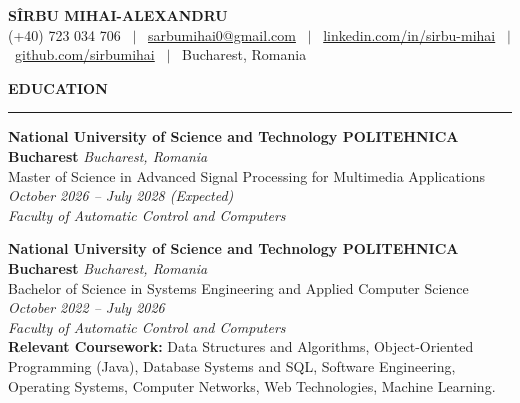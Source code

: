 \documentclass[10pt,letterpaper]{article}
\newenvironment{rSection}[1]{
  \vspace{4pt}
  {\bfseries\MakeUppercase{#1}}
  \vspace{2pt}
  \hrule
  \vspace{3pt}
}{
  \par\vspace{2pt}
}
\begin{document}
\vspace*{-0.4cm}
\begin{center}
    {\Huge \bfseries SÎRBU MIHAI-ALEXANDRU} \\ \vspace{2pt}
    \small (+40) 723 034 706 \ $|$ \ 
    \href{mailto:sarbumihai0@gmail.com}{sarbumihai0@gmail.com} \ $|$ \ 
    \href{https://www.linkedin.com/in/sirbu-mihai-86133b181/}{linkedin.com/in/sirbu-mihai} \ $|$ \ 
    \href{https://github.com/sirbumihai}{github.com/sirbumihai} \ $|$ \ 
    Bucharest, Romania
\end{center}

\vspace{-0.2cm}
\begin{rSection}{Education}
    \textbf{National University of Science and Technology POLITEHNICA Bucharest} \hfill \textit{Bucharest, Romania} \\
    Master of Science in Advanced Signal Processing for Multimedia Applications \hfill \textit{October 2026 – July 2028 (Expected)} \\
    \textit{Faculty of Automatic Control and Computers}

    \vspace{3pt}
    \textbf{National University of Science and Technology POLITEHNICA Bucharest} \hfill \textit{Bucharest, Romania} \\
    Bachelor of Science in Systems Engineering and Applied Computer Science \hfill \textit{October 2022 – July 2026} \\
    \textit{Faculty of Automatic Control and Computers} \\
    \textbf{Relevant Coursework:} Data Structures and Algorithms, Object-Oriented Programming (Java), Database Systems and SQL, Software Engineering, Operating Systems, Computer Networks, Web Technologies, Machine Learning.
\end{rSection}
\end{document}
